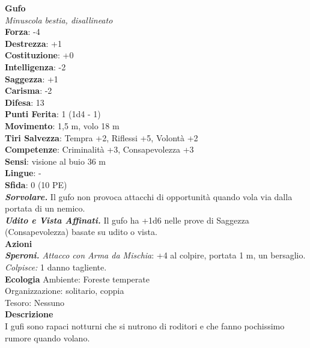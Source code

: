 \begin{multicols}{2}
\medskip\textbf{Gufo}\\
\emph{Minuscola bestia, disallineato}\\
\textbf{Forza}: -4\\
\textbf{Destrezza}: +1\\
\textbf{Costituzione}: +0\\
\textbf{Intelligenza}: -2\\
\textbf{Saggezza}: +1\\
\textbf{Carisma}: -2\\
\textbf{Difesa}: 13\\
\textbf{Punti Ferita}: 1 (1d4 - 1)\\
\textbf{Movimento}: 1,5 m, volo 18 m\\
\textbf{Tiri Salvezza}: Tempra +2, Riflessi +5, Volontà +2 \\
\textbf{Competenze}: Criminalità +3, Consapevolezza +3\\
\textbf{Sensi}: visione al buio 36 m\\
\textbf{Lingue}: -\\
\textbf{Sfida}: 0 (10 PE)\smallskip\\
\emph{\textbf{Sorvolare.}} Il gufo non provoca attacchi di opportunità quando vola via dalla portata di un nemico.\\
\emph{\textbf{Udito e Vista Affinati.}} Il gufo ha +1d6 nelle prove di Saggezza (Consapevolezza) basate su udito o vista.\\
\smallskip\textbf{Azioni}\\
\emph{\textbf{Speroni.} Attacco con Arma da Mischia}: +4 al colpire, portata 1 m, un bersaglio.\\
\emph{Colpisce:} 1 danno tagliente.\\
\textbf{Ecologia}
Ambiente: Foreste temperate\\
Organizzazione: solitario, coppia\\
Tesoro: Nessuno\\
\textbf{Descrizione}\\
I gufi sono rapaci notturni che si nutrono di roditori e che fanno pochissimo rumore quando volano. \\


\end{multicols}
